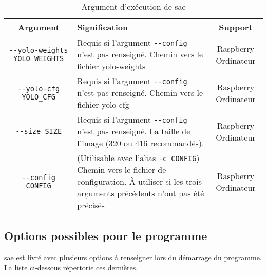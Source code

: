 \begin{table}[H]
    \centering
    \begin{tabularx}{\linewidth}{|c|X|c|}
        \hline
        \rowcolor{tableColorDark} Argument      & Signification                                                                                                                                             & Support              \\
        \hline
        \texttt{-{}-yolo-weights YOLO\_WEIGHTS} & Requis si l'argument \texttt{-{}-config} n'est pas renseigné. Chemin vers le fichier yolo-weights                                                         & Raspberry Ordinateur \\\hline
        \texttt{-{}-yolo-cfg YOLO\_CFG}         & Requis si l'argument \texttt{-{}-config} n'est pas renseigné. Chemin vers le fichier yolo-cfg                                                             & Raspberry Ordinateur \\\hline
        \texttt{-{}-size SIZE}                  & Requis si l'argument \texttt{-{}-config} n'est pas renseigné. La taille de l'image (320 ou 416 recommandés).                                              & Raspberry Ordinateur \\\hline
        \texttt{-{}-config CONFIG}              & (Utilisable avec l'alias \texttt{-c CONFIG}) Chemin vers le fichier de configuration. À utiliser si les trois arguments précédents n'ont pas été précisés & Raspberry Ordinateur \\\hline
    \end{tabularx}
    \label{tab:ArgClearway}
    \caption{Argument d'exécution de \gls{sae}}
\end{table}

\subsection{Options possibles pour le programme}
\label{sec:executionOption_clearWay}
\gls{sae} est livré avec plusieurs options à renseigner lors du démarrage du programme. La liste ci-dessous répertorie ces dernières.

